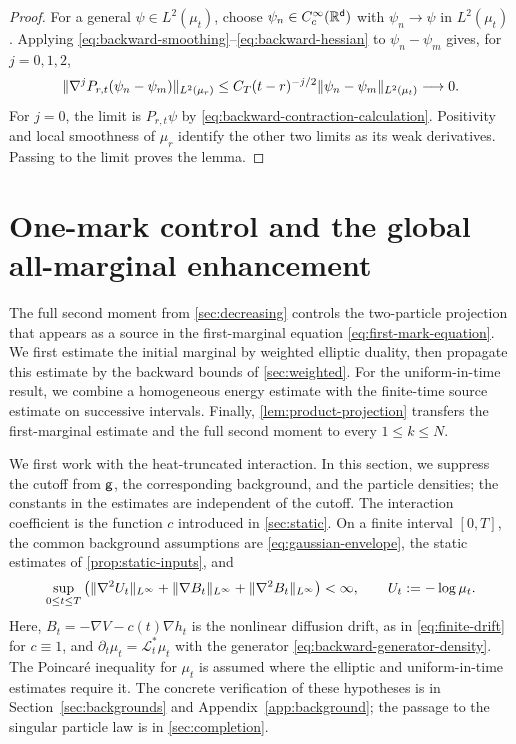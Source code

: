 \documentclass[11pt,reqno]{amsart}
\numberwithin{equation}{section}
\theoremstyle{plain}
\theoremstyle{remark}
\DeclarePairedDelimiter{\norm}{\lVert}{\rVert}
\renewcommand{\d}{\mathsf{d}}\newcommand{\s}{\mathsf{s}}
\begin{document}
\begin{proof}
For a general $\psi\in L^2(\mu_t)$, choose $\psi_n\in C_c^\infty(\R^\d)$ with $\psi_n\to\psi$ in $L^2(\mu_t)$. Applying \eqref{eq:backward-smoothing}--\eqref{eq:backward-hessian} to $\psi_n-\psi_m$ gives, for $j=0,1,2$,
\begin{equation}\label{eq:backward-test-approximation}
 \norm{\nabla^jP_{r,t}(\psi_n-\psi_m)}_{L^2(\mu_r)}
 \le C_T(t-r)^{-j/2}\norm{\psi_n-\psi_m}_{L^2(\mu_t)}\longrightarrow0.
\end{equation}
For $j=0$, the limit is $P_{r,t}\psi$ by \eqref{eq:backward-contraction-calculation}. Positivity and local smoothness of $\mu_r$ identify the other two limits as its weak derivatives. Passing to the limit proves the lemma.
\end{proof}

\par\endgroup

\begingroup

\section{One-mark control and the global all-marginal enhancement}\label{sec:marginals}

The full second moment from \cref{sec:decreasing} controls the two-particle projection that appears as a source in the first-marginal equation \eqref{eq:first-mark-equation}. We first estimate the initial marginal by weighted elliptic duality, then propagate this estimate by the backward bounds of \cref{sec:weighted}. For the uniform-in-time result, we combine a homogeneous energy estimate with the finite-time source estimate on successive intervals. Finally, \cref{lem:product-projection} transfers the first-marginal estimate and the full second moment to every $1\le k\le N$.

We first work with the heat-truncated interaction. In this section, we suppress the cutoff from $\mathsf g$, the corresponding background, and the particle densities; the constants in the estimates are independent of the cutoff. The interaction coefficient is the function $c$ introduced in \cref{sec:static}. On a finite interval $[0,T]$, the common background assumptions are \eqref{eq:gaussian-envelope}, the static estimates of \cref{prop:static-inputs}, and
\begin{equation}\label{eq:mark-background-bounds}
 \sup_{0\le t\le T}\left(\norm{\nabla^2U_t}_{L^\infty}
  +\norm{\nabla B_t}_{L^\infty}+\norm{\nabla^2B_t}_{L^\infty}\right)<\infty,
 \qquad U_t:=-\log\mu_t.
\end{equation}
Here, $B_t=-\nabla V-c(t)\nabla h_t$ is the nonlinear diffusion drift, as in \eqref{eq:finite-drift} for $c\equiv1$, and $\partial_t\mu_t=\mathcal L_t^*\mu_t$ with the generator \eqref{eq:backward-generator-density}. The Poincar\'e inequality for $\mu_t$ is assumed where the elliptic and uniform-in-time estimates require it. The concrete verification of these hypotheses is in Section~\ref{sec:backgrounds} and Appendix~\ref{app:background}; the passage to the singular particle law is in \cref{sec:completion}.
\end{document}
